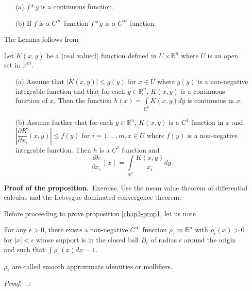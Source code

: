 \begin{lemma}\label{chap3-lem2}
\begin{itemize}
\item[\rm(a)] $f\ast g$ is a continuous function.

\item[\rm(b)] If $f$ is a $C^{\infty}$ function $f\ast g$ is a $C^{\infty}$ function.
\end{itemize}
\end{lemma}

The Lemma follows from

\begin{proposition}\label{chap3-prop2}
Let $K(x,y)$ be a (real valued) function defined in $U\times \mathbb{R}^{n}$ where $U$ is an open set in $\mathbb{R}^{m}$.
\begin{itemize}
\item[\rm(a)] Assume that $|K(x,y)|\leq g(y)$ for $x\in U$ where $g(y)$ is a non-negative integrable function and that for each $y\in \mathbb{R}^{n}$, $K(x,y)$ is a continuous function of $x$. Then the function $h(x)=\int\limits_{\mathbb{R}^{n}}K(x,y)dy$ is continuous in $x$.

\item[\rm(b)] Assume further that for each $y\in \mathbb{R}^{n}$, $K(x,y)$ is a $C^{1}$ function in $x$ and $\left|\dfrac{\partial K}{\partial x_{i}}(x,y)\right|\leq f(y)$ for $i=1,\ldots,m,x\in U$ where $f(y)$ is a non-negative integrable function. Then $h$ is a $C^{1}$ function and
$$
\frac{\partial h}{\partial x_{i}}(x)=\int\limits_{\mathbb{R}^{n}}\frac{K(x,y)}{x_{i}}dy.
$$
\end{itemize}
\end{proposition}

\noindent
{\bf Proof of the proposition.}~Exercise. Use the mean value theorem of differential calculus and the Lebesgue dominated convergence theorem.

Before proceeding to prove proposition \ref{chap3-prop1} let us note

\begin{lemma}\label{chap3-lem3}
For any $\epsilon > 0$, there exists a non-negative $C^{\infty}$ function $\rho_{\epsilon}$ in $\mathbb{R}^{n}$ with $\rho_{\epsilon}(x)>0$ for $|x|<\epsilon$ whose support is in the closed ball $B_{\epsilon}$ of radius $\epsilon$ around the origin and such that $\int \rho_{\epsilon}(x)dx=1$.
\end{lemma}

\begin{remark*}
$\rho_{\epsilon}$ are called smooth approximate identities or mollifiers.
\end{remark*}

\begin{proof}
\end{proof}
